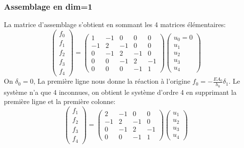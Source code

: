 \documentclass{beamer}
\begin{document}
\begin{frame}
\frametitle{Assemblage en dim=1}
La matrice d'assemblage s'obtient en sommant les 4 matrices élémentaires:
\[\left(\begin{array}{c} 
f_{0}\\f_{1}\\f_{2}\\f_{3}\\f_{4}
\end{array}\right)=\left(\begin{array}{ccccc} 
1&-1&0&0&0\\-1&2&-1&0&0\\
0&-1&2&-1&0\\0&0&-1&2&-1\\
0&0&0&-1&1
\end{array}\right) \left(\begin{array}{l} 
u_{0}=0\\u_{1}\\u_{2}\\u_{3}\\u_{4}
\end{array}\right)
\]
On $\delta_0=0$, La première ligne nous donne la réaction à l'origine $f_0=-\frac{EA_0}{h_0}\delta_1$. Le système n'a que 4 inconnues, on obtient le système d'ordre 4 en supprimant la première ligne et la première colonne:
\[\left(\begin{array}{c} 
f_{1}\\f_{2}\\f_{3}\\f_{4}
\end{array}\right)=\left(\begin{array}{cccc} 
2&-1&0&0\\
-1&2&-1&0\\
0&-1&2&-1\\
0&0&-1&1
\end{array}\right) \left(\begin{array}{l} 
u_{1}\\u_{2}\\u_{3}\\u_{4}
\end{array}\right)
\]

\end{frame}
\end{document}
